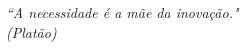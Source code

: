 \begin{epigrafe}
    \vspace*{\fill}
	\begin{flushright}
		\textit{``A necessidade é a mãe da inovação." 
		\\(Platão)}
	\end{flushright}
\end{epigrafe}
